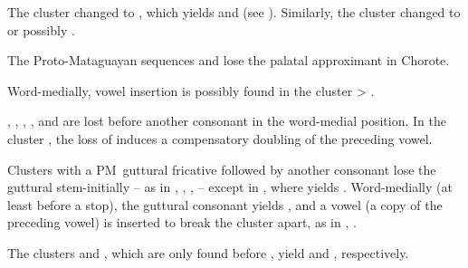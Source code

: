 The cluster  changed to , which yields  and  (see ). Similarly, the cluster  changed to  or possibly .

\begin{exe}
    \ex \bite
    \ex \tornkf
    \ex \frighten
\end{exe}

The Proto-Mataguayan sequences  and  lose the palatal approximant in Chorote.

\begin{exe}
    \ex \smelln
    \ex \cavy
\end{exe}

Word-medially, vowel insertion is possibly found in the cluster  > .

\begin{exe}
    \ex \toad
\end{exe}

, , , , and  are lost before another consonant in the word-medial position. In the cluster , the loss of  induces a compensatory doubling of the preceding vowel.

\begin{exe}
    \ex \elbow
    \ex \welln
    \ex \cavy
    \ex \fingerjaqsi
    \ex \rib
    \ex \belly
\end{exe}

Clusters with a PM~guttural fricative followed by another consonant lose the guttural stem-initially – as in , , ,  – except in , where  yields . Word-medially (at least before a stop), the guttural consonant yields , and a vowel (a copy of the preceding vowel) is inserted to break the cluster apart, as in , .

\begin{exe}
    \ex \cavy \label{ch-nxt-cavy}
    \ex \spring \label{ch-xn-spring}
    \ex \straw \label{ch-xp-straw}
    \ex \fox \label{ch-xm-fox}
    \ex \shadow \label{ch-xp-shadow}
    \ex \moon \label{ch-xw-moon}
    \ex \femalebreast \label{ch-xt-femalebreast}
\end{exe}

The clusters  and , which are only found before , yield  and , respectively.

